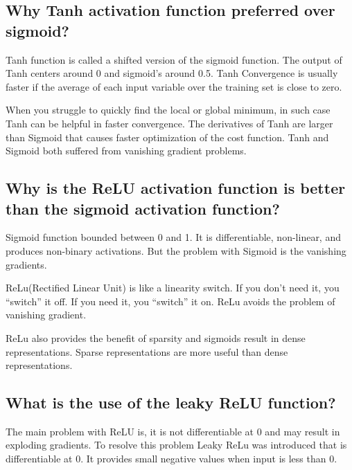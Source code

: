 \documentclass[
]{book}
\begin{document}
\hypertarget{why-tanh-activation-function-preferred-over-sigmoid}{%
\subsection{Why Tanh activation function preferred over sigmoid?}\label{why-tanh-activation-function-preferred-over-sigmoid}}

Tanh function is called a shifted version of the sigmoid function. The output of Tanh centers around 0 and sigmoid's around 0.5. Tanh Convergence is usually faster if the average of each input variable over the training set is close to zero.

When you struggle to quickly find the local or global minimum, in such case Tanh can be helpful in faster convergence. The derivatives of Tanh are larger than Sigmoid that causes faster optimization of the cost function. Tanh and Sigmoid both suffered from vanishing gradient problems.

\hypertarget{why-is-the-relu-activation-function-is-better-than-the-sigmoid-activation-function}{%
\subsection{Why is the ReLU activation function is better than the sigmoid activation function?}\label{why-is-the-relu-activation-function-is-better-than-the-sigmoid-activation-function}}

Sigmoid function bounded between 0 and 1. It is differentiable, non-linear, and produces non-binary activations. But the problem with Sigmoid is the vanishing gradients.

ReLu(Rectified Linear Unit) is like a linearity switch. If you don't need it, you ``switch'' it off. If you need it, you ``switch'' it on. ReLu avoids the problem of vanishing gradient.

ReLu also provides the benefit of sparsity and sigmoids result in dense representations. Sparse representations are more useful than dense representations.

\hypertarget{what-is-the-use-of-the-leaky-relu-function}{%
\subsection{What is the use of the leaky ReLU function?}\label{what-is-the-use-of-the-leaky-relu-function}}

The main problem with ReLU is, it is not differentiable at 0 and may result in exploding gradients. To resolve this problem Leaky ReLu was introduced that is differentiable at 0. It provides small negative values when input is less than 0.
\end{document}
